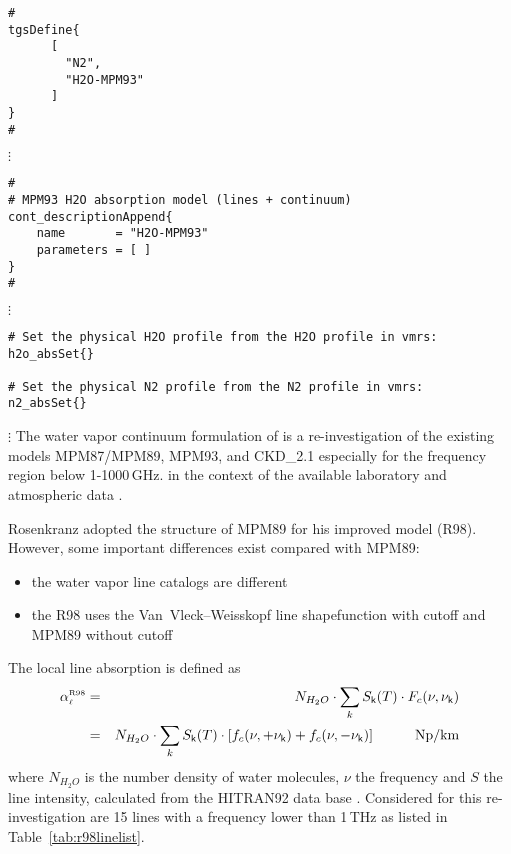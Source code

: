 {

\begin{verbatim}
#
tgsDefine{
      [ 
        "N2",
        "H2O-MPM93"
      ] 
}
#
\end{verbatim}
$\vdots$
\begin{verbatim}
#
# MPM93 H2O absorption model (lines + continuum)
cont_descriptionAppend{
    name       = "H2O-MPM93"
    parameters = [ ]
}
#
\end{verbatim}
$\vdots$
\begin{verbatim}
# Set the physical H2O profile from the H2O profile in vmrs:
h2o_absSet{}

# Set the physical N2 profile from the N2 profile in vmrs:
n2_absSet{}
\end{verbatim}
$\vdots$
%
%
%
% 
\label{leveld:pwr98}
The water vapor continuum formulation of \citet{pwr:98} is a re-investigation 
of the existing models MPM87/MPM89, MPM93, and CKD\_2.1 especially for 
the frequency region below 1-1000\,GHz. in the context of the available
laboratory and atmospheric data \citep{abaueretal:89, abaueretal:93, 
abaueretal:95, beckerautler:46, englishetal:94, godonetal:92,
liebe:84, liebeandlayton:87, westwateretal:90}.

Rosenkranz adopted the structure of MPM89 for his improved model (R98). 
However, some important differences exist compared with MPM89:
\begin{itemize}
\item the water vapor line catalogs are different 
\item the R98 uses the Van~Vleck--Weisskopf line shapefunction with 
      cutoff and MPM89 without cutoff
\end{itemize}

\label{levele:pwr98_line}
The local line absorption is defined as 
\begin{eqnarray} 
 \label{eq:r98absline}
 \alphapwrl &=& N_{H_2O} \cdot \sum_k \inten \cdot \shapec \nonumber\\
            &=& N_{H_2O} \cdot \sum_k \inten \cdot 
                \left [\shapefp + \shapefm \right]\hspace*{10mm}\mbox{Np/km}
\end{eqnarray}
where $N_{H_2O}$ is the number density of water molecules, $\nu$ the
frequency and $S$ the line intensity, calculated from the HITRAN92
data base \citet{rothman:92}. Considered for this re-investigation are 
15 lines with a frequency lower than 1\,THz as listed in 
Table~\ref{tab:r98linelist}.

}
